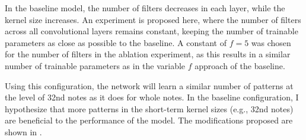 
In the baseline model, the number of filters decreases in
each layer, while the kernel size increases. An experiment
is proposed here, where the number of filters across all
convolutional layers remains constant, keeping the number of
trainable parameters as close as possible to the baseline. A
constant of $f=5$ was chosen for the number of filters in
the ablation experiment, as this results in a similar number
of trainable parameters as in the variable $f$ approach of
the baseline.

Using this configuration, the network will learn a similar
number of patterns at the level of \gls{32nd} notes as it
does for \gls{whole} notes. In the baseline configuration, I
hypothesize that more patterns in the short-term kernel
sizes (e.g., \gls{32nd} notes) are beneficial to the
performance of the model. The modifications proposed are
shown in .

